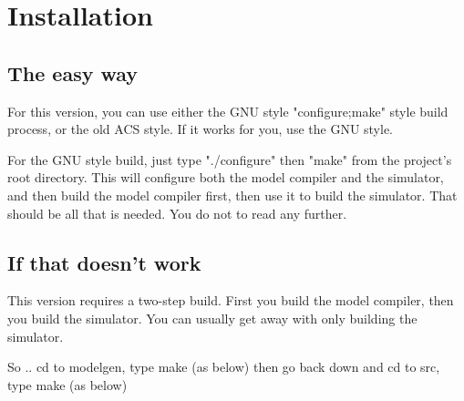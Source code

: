 %
%
%
%
\chapter{Installation}


\section{The easy way}

For this version, you can use either the GNU style "configure;make"
style build process, or the old ACS style.  If it works for you, use
the GNU style.

For the GNU style build, just type "./configure" then "make" from the
project's root directory.  This will configure both the model compiler
and the simulator, and then build the model compiler first, then use
it to build the simulator.  That should be all that is needed.  You do
not to read any further.

\section{If that doesn't work}

This version requires a two-step build.  First you build the model
compiler, then you build the simulator.  You can usually get away with
only building the simulator.

So ..
cd to modelgen, type make (as below)
then go back down and cd to src, type make (as below)

